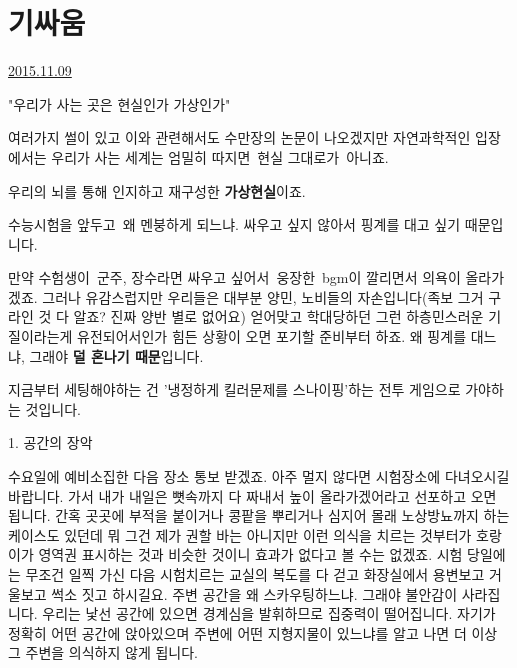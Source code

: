 \section{기싸움}
\href{https://www.kockoc.com/Apoc/470657}{2015.11.09}

\vspace{5mm}

"우리가 사는 곳은 현실인가 가상인가"
\vspace{5mm}

여러가지 썰이 있고 이와 관련해서도 수만장의 논문이 나오겠지만
자연과학적인 입장에서는
우리가 사는 세계는 엄밀히 따지면 현실 그대로가 아니죠.
\vspace{5mm}

우리의 뇌를 통해 인지하고 재구성한 \textbf{가상현실}이죠.
\vspace{5mm}

수능시험을 앞두고 왜 멘붕하게 되느냐.
싸우고 싶지 않아서 핑계를 대고 싶기 때문입니다.
\vspace{5mm}

만약 수험생이 군주, 장수라면 싸우고 싶어서 웅장한 bgm이 깔리면서 의욕이 올라가겠죠.
그러나 유감스럽지만 우리들은 대부분 양민, 노비들의 자손입니다(족보 그거 구라인 것 다 알죠? 진짜 양반 별로 없어요)
얻어맞고 학대당하던 그런 하층민스러운 기질이라는게 유전되어서인가 힘든 상황이 오면 포기할 준비부터 하죠.
왜 핑계를 대느냐, 그래야 \textbf{덜 혼나기 때문}입니다.
\vspace{5mm}

지금부터 세팅해야하는 건 '냉정하게 킬러문제를 스나이핑'하는 전투 게임으로 가야하는 것입니다.
\vspace{5mm}

\item 1. 공간의 장악
\vspace{5mm}

수요일에 예비소집한 다음 장소 통보 받겠죠. 아주 멀지 않다면 시험장소에 다녀오시길 바랍니다.
가서 내가 내일은 뼛속까지 다 짜내서 높이 올라가겠어라고 선포하고 오면 됩니다.
간혹 곳곳에 부적을 붙이거나 콩팥을 뿌리거나 심지어 몰래 노상방뇨까지 하는 케이스도 있던데 뭐 그건 제가 권할 바는 아니지만
이런 의식을 치르는 것부터가 호랑이가 영역권 표시하는 것과 비슷한 것이니 효과가 없다고 볼 수는 없겠죠.
시험 당일에는 무조건 일찍 가신 다음 시험치르는 교실의 복도를 다 걷고 화장실에서 용변보고 거울보고 썩소 짓고 하시길요.
주변 공간을 왜 스카우팅하느냐. 그래야 불안감이 사라집니다. 우리는 낯선 공간에 있으면 경계심을 발휘하므로 집중력이 떨어집니다.
자기가 정확히 어떤 공간에 앉아있으며 주변에 어떤 지형지물이 있느냐를 알고 나면 더 이상 그 주변을 의식하지 않게 됩니다.
\vspace{5mm}

